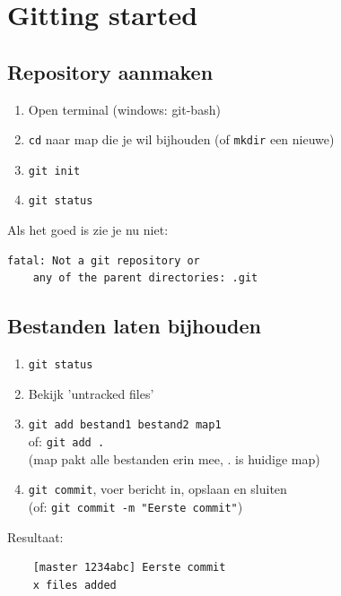 \section{Gitting started}	%

\subsection{Repository aanmaken}
\begin{frame}[fragile]
	\begin{enumerate}
		\item Open terminal (windows: \alert{git-bash})
		\item \texttt{cd} naar map die je wil bijhouden
			(of \texttt{mkdir} een nieuwe)
		\item \texttt{git init}
		\item \texttt{git status}
	\end{enumerate}
	Als het goed is zie je nu \alert{niet}:
	\begin{verbatim}
fatal: Not a git repository or 
	any of the parent directories: .git
	\end{verbatim}
\end{frame}

\subsection{Bestanden laten bijhouden}
\begin{frame}[fragile]
	\begin{enumerate}
		\item \texttt{git status}
		\item Bekijk 'untracked files'
		\item \texttt{git add bestand1 bestand2 map1}\\ of:
			\texttt{git add .}\\
			(map pakt alle bestanden erin mee, . is huidige map)
		\item \texttt{git commit}, voer bericht in, opslaan en sluiten\\
			(of: \texttt{git commit -m "Eerste commit"})
	\end{enumerate}
	Resultaat: 
	\begin{verbatim}
	[master 1234abc] Eerste commit
	x files added
	\end{verbatim}
\end{frame}

